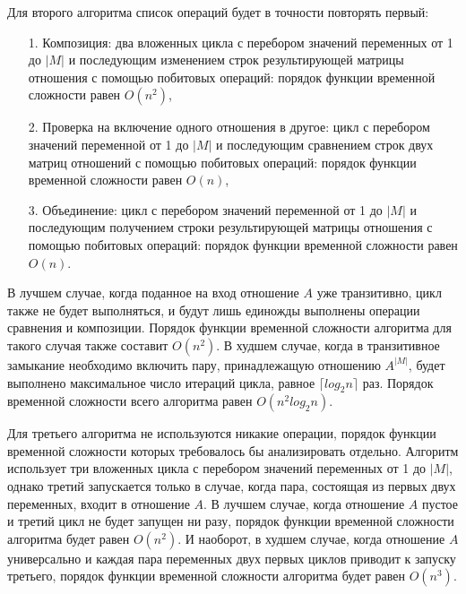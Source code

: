 \documentclass[12pt]{article}
\begin{document}
	Для второго алгоритма список операций будет в точности повторять первый:
	\begin{itemize}
		\item[1.] Композиция: два вложенных цикла с перебором значений переменных от 1 до $|M|$ и последующим изменением строк результирующей матрицы отношения с помощью побитовых операций: порядок функции временной сложности равен $O(n^2)$,
		\item[2.] Проверка на включение одного отношения в другое: цикл с перебором значений переменной от 1 до $|M|$ и последующим сравнением строк двух матриц отношений с помощью побитовых операций: порядок функции временной сложности равен $O(n)$,
		\item[3.] Объединение: цикл с перебором значений переменной от 1 до $|M|$ и последующим получением строки результирующей матрицы отношения с помощью побитовых операций: порядок функции временной сложности равен $O(n)$.
	\end{itemize}
	В лучшем случае, когда поданное на вход отношение $A$ уже транзитивно, цикл также не будет выполняться, и будут лишь единожды выполнены операции сравнения и композиции. Порядок функции временной сложности алгоритма для такого случая также составит $O(n^2)$. В худшем случае, когда в транзитивное замыкание необходимо включить пару, принадлежащую отношению $A^{|M|}$, будет выполнено максимальное число итераций цикла, равное $\lceil log_2{n}\rceil$ раз. Порядок временной сложности всего алгоритма равен $O(n^2log_2{n})$.
	
	Для третьего алгоритма не используются никакие операции, порядок функции временной сложности которых требовалось бы анализировать отдельно. Алгоритм использует три вложенных цикла с перебором значений переменных от 1 до $|M|$, однако третий запускается только в случае, когда пара, состоящая из первых двух переменных, входит в отношение $A$. В лучшем случае, когда отношение $A$ пустое и третий цикл не будет запущен ни разу, порядок функции временной сложности алгоритма будет равен $O(n^2)$. И наоборот, в худшем случае, когда отношение $A$ универсально и каждая пара переменных двух первых циклов приводит к запуску третьего, порядок функции временной сложности алгоритма будет равен $O(n^3)$.
	
\end{document}
